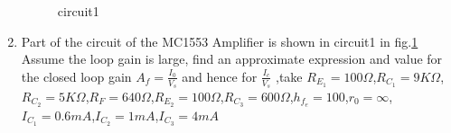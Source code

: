 \begin{enumerate}[label=\thesubsection.\arabic*.,ref=\thesubsection.\theenumi]
\begin{figure}[!ht]
	\begin{center}
		
		\resizebox{\columnwidth}{!}{}
	\end{center}
\caption{circuit1}
\label{fig:circuit1}
\end{figure}

\item
 Part of the circuit of the MC1553 Amplifier is shown in circuit1 in  fig.\ref{fig:circuit1} Assume the loop gain is large, find an approximate expression and value for the closed loop gain $A_f=\frac{I_0}{V_s}$ and hence for $\frac{I_c}{V_s}$ ,take $R_E_1=100\Omega$,$R_C_1=9K\Omega$,$R_C_2=5K\Omega$,$R_F=640\Omega$,$R_E_2=100\Omega$,$R_C_3=600\Omega$,$h_f_e=100$,$r_0=\infty$,$I_C_1=0.6mA$,$I_C_2=1mA$,$I_C_3=4mA$
 
\begin{figure}[!ht]
	\begin{center}
		

\end{center}
\end{figure}
\end{enumerate}
